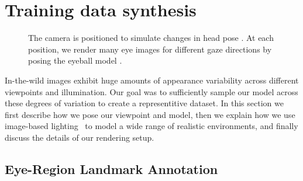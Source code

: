 
\section{Training data synthesis}

\begin{figure}
	\captionsetup[subfigure]{labelformat=empty} %
    \captionsetup{subrefformat=parens} %
    \centering
    \begin{subfigure}[t]{0.48\columnwidth}
        \caption{}\label{fig:cam_pos_spher_coords}
    \end{subfigure}
    \hfill
    \begin{subfigure}[t]{0.48\columnwidth}
        \caption{}\label{fig:cam_pos_example_renders}
    \end{subfigure}
    \par\vspace{-28pt}
    \caption{The camera is positioned to simulate changes in head pose . At each position, we render many eye images for different gaze directions by posing the eyeball model .}
    \label{fig:cam_pos}
\end{figure}

In-the-wild images exhibit huge amounts of appearance variability across different viewpoints and illumination. Our goal was to sufficiently sample our model across these degrees of variation to create a representitive dataset.
In this section we first describe how we pose our viewpoint and model, then we explain how we use image-based lighting~\cite{debevec2002image} to model a wide range of realistic environments, and finally discuss the details of our rendering setup.

\subsection{Eye-Region Landmark Annotation}


